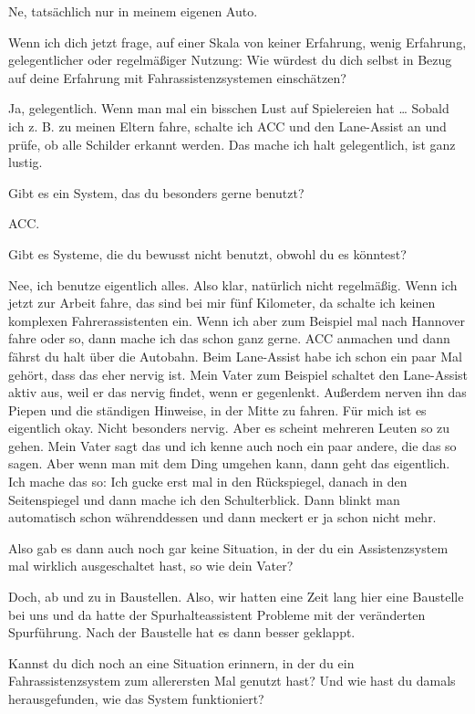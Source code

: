 Ne, tatsächlich nur in meinem eigenen Auto.

\interviewerin
Wenn ich dich jetzt frage, auf einer Skala von keiner Erfahrung, wenig
Erfahrung, gelegentlicher oder regelmäßiger Nutzung: Wie würdest du
dich selbst in Bezug auf deine Erfahrung mit Fahrassistenzsystemen
einschätzen?

Ja, gelegentlich. Wenn man mal ein bisschen Lust auf Spielereien hat …
Sobald ich z. B. zu meinen Eltern fahre, schalte ich ACC und den
Lane-Assist an und prüfe, ob alle Schilder erkannt werden. Das mache ich
halt gelegentlich, ist ganz lustig.

\interviewerin
Gibt es ein System, das du besonders gerne benutzt?

ACC.

\interviewerin
Gibt es Systeme, die du bewusst nicht benutzt, obwohl du es könntest?

Nee, ich benutze eigentlich alles. Also klar, natürlich nicht
regelmäßig. Wenn ich jetzt zur Arbeit fahre, das sind bei mir fünf
Kilometer, da schalte ich keinen komplexen Fahrerassistenten ein. Wenn
ich aber zum Beispiel mal nach Hannover fahre oder so, dann mache ich
das schon ganz gerne. ACC anmachen und dann fährst du halt über die
Autobahn. Beim Lane-Assist habe ich schon ein paar Mal gehört, dass das
eher nervig ist. Mein Vater zum Beispiel schaltet den Lane-Assist aktiv
aus, weil er das nervig findet, wenn er gegenlenkt. Außerdem nerven ihn
das Piepen und die ständigen Hinweise, in der Mitte zu fahren. Für mich
ist es eigentlich okay. Nicht besonders nervig. Aber es scheint mehreren
Leuten so zu gehen. Mein Vater sagt das und ich kenne auch noch ein paar
andere, die das so sagen. Aber wenn man mit dem Ding umgehen kann, dann
geht das eigentlich. Ich mache das so: Ich gucke erst mal in den
Rückspiegel, danach in den Seitenspiegel und dann mache ich den
Schulterblick. Dann blinkt man automatisch schon währenddessen und dann
meckert er ja schon nicht mehr.

\interviewerin
Also gab es dann auch noch gar keine Situation, in der du ein
Assistenzsystem mal wirklich ausgeschaltet hast, so wie dein Vater?

Doch, ab und zu in Baustellen. Also, wir hatten eine Zeit lang hier eine
Baustelle bei uns und da hatte der Spurhalteassistent Probleme mit der
veränderten Spurführung. Nach der Baustelle hat es dann besser geklappt.

\interviewerin
Kannst du dich noch an eine Situation erinnern, in der du ein
Fahrassistenzsystem zum allerersten Mal genutzt hast? Und wie hast du
damals herausgefunden, wie das System funktioniert?

